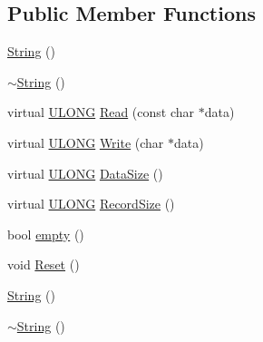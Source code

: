 \subsection*{Public Member Functions}
\begin{DoxyCompactItemize}
\item 
\hyperlink{struct_y_excel_1_1_worksheet_1_1_cell_table_1_1_row_block_1_1_cell_block_1_1_formula_1_1_string_ad835006c653c43d87b6eb9ee8e8264ef}{String} ()
\item 
\hyperlink{struct_y_excel_1_1_worksheet_1_1_cell_table_1_1_row_block_1_1_cell_block_1_1_formula_1_1_string_a0553326baf7ccd843ea5ec798bafcbb3}{$\sim$\+String} ()
\item 
virtual \hyperlink{_basic_excel_8hpp_abe09d1bea023be6a07cbadde8e955435}{U\+L\+O\+N\+G} \hyperlink{struct_y_excel_1_1_worksheet_1_1_cell_table_1_1_row_block_1_1_cell_block_1_1_formula_1_1_string_acb02bef34d1f5449bb4618fb28a7b953}{Read} (const char $\ast$data)
\item 
virtual \hyperlink{_basic_excel_8hpp_abe09d1bea023be6a07cbadde8e955435}{U\+L\+O\+N\+G} \hyperlink{struct_y_excel_1_1_worksheet_1_1_cell_table_1_1_row_block_1_1_cell_block_1_1_formula_1_1_string_af94bb8d0af843bea6acb0437f1e00576}{Write} (char $\ast$data)
\item 
virtual \hyperlink{_basic_excel_8hpp_abe09d1bea023be6a07cbadde8e955435}{U\+L\+O\+N\+G} \hyperlink{struct_y_excel_1_1_worksheet_1_1_cell_table_1_1_row_block_1_1_cell_block_1_1_formula_1_1_string_aae08e8ecede543bc987b00c7cf6017cc}{Data\+Size} ()
\item 
virtual \hyperlink{_basic_excel_8hpp_abe09d1bea023be6a07cbadde8e955435}{U\+L\+O\+N\+G} \hyperlink{struct_y_excel_1_1_worksheet_1_1_cell_table_1_1_row_block_1_1_cell_block_1_1_formula_1_1_string_a78b5996ce635f2b9df87f7a9834a68c6}{Record\+Size} ()
\item 
bool \hyperlink{struct_y_excel_1_1_worksheet_1_1_cell_table_1_1_row_block_1_1_cell_block_1_1_formula_1_1_string_aae18ab22d2b9ea78e8d768a31fe0cd1e}{empty} ()
\item 
void \hyperlink{struct_y_excel_1_1_worksheet_1_1_cell_table_1_1_row_block_1_1_cell_block_1_1_formula_1_1_string_a6c61d42b4b7cb343fd134c4540ad3b80}{Reset} ()
\item 
\hyperlink{struct_y_excel_1_1_worksheet_1_1_cell_table_1_1_row_block_1_1_cell_block_1_1_formula_1_1_string_ad835006c653c43d87b6eb9ee8e8264ef}{String} ()
\item 
\hyperlink{struct_y_excel_1_1_worksheet_1_1_cell_table_1_1_row_block_1_1_cell_block_1_1_formula_1_1_string_a0553326baf7ccd843ea5ec798bafcbb3}{$\sim$\+String} ()

\end{DoxyCompactItemize}
